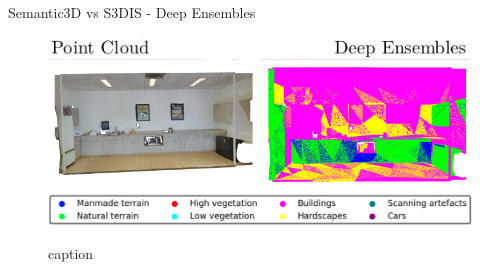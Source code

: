 \documentclass[aspectratio=169]{beamer}
\begin{document}
\begin{frame}{Semantic3D vs S3DIS - Deep Ensembles}
    \begin{figure}
        \centering
        \includegraphics[scale=0.5]{images/s3dis/top_legend_s3dis_DE.jpg}
        \includegraphics[scale=0.5]{images/s3dis/S3DIS_DE_output.jpg}
        \includegraphics[scale=0.25]{images/legend.jpg}
        \caption{caption}
        \label{fig:s3dis_de_op}
    \end{figure}
\end{frame}
\end{document}
